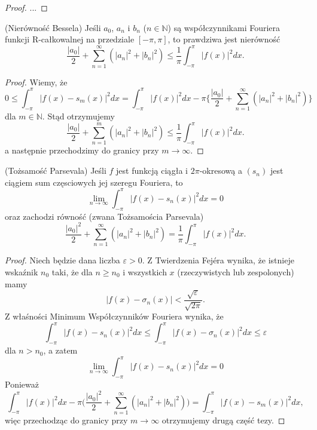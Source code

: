 \documentclass[leqno]{article}
\begin{document}
\begin{justify}
\begin{proof}
...
\end{proof}

\begin{wniosek}
{
    (Nierówność Bessela) Jeśli $a_0$, $a_n$ i $b_n$ ($n \in \mathbb{N}$) są współczynnikami Fouriera
    funkcji R-całkowalnej na przedziale $[-\pi, \pi]$, to prawdziwa jest nierówność 
    \[
        \frac{|a_0|}{2} + \sum_{n=1}^{\infty}(|a_n|^2 + |b_n|^2) \leqslant \frac{1}{\pi}\int_{-\pi}^{\pi}|f(x)|^2dx.
    \]
}
\end{wniosek}

\begin{proof}
    Wiemy, że 
    \[
        0 \leqslant \int_{-\pi}^{\pi}|f(x) - s_m(x)|^2dx = \int_{-\pi}^{\pi}|f(x)|^2 dx - \pi \Big\{ \frac{|a_0|}{2} + \sum_{n=1}^{\infty}(|a_n|^2 + |b_n|^2)\Big\}
    \]
    dla $m \in \mathbb{N}$. Stąd otrzymujemy
    \[
        \frac{|a_0|}{2} + \sum_{n=1}^{m}(|a_n|^2 + |b_n|^2) \leqslant \frac{1}{\pi}\int_{-\pi}^{\pi}|f(x)|^2dx.
    \]
    a następnie przechodzimy do granicy przy $m \to \infty$. 
\end{proof}

\begin{theorem}
{
    (Tożsamość Parsevala)
    Jeśli $f$ jest funkcją ciągła i $2\pi$-okresową a $(s_n)$ jest ciągiem sum częsciowych jej szeregu Fouriera, to 
    \[
        \lim_{n \to \infty}\int_{-\pi}^{\pi}{|f(x) - s_n(x)|}^2dx = 0
    \]
    oraz zachodzi równość (zwana Tożsamościa Parsevala)
    \[
        \frac{|a_0|^2}{2} + \sum_{n=1}^{\infty}(|a_n|^2 + |b_n|^2) = \frac{1}{\pi}\int_{-\pi}^{\pi}{|f(x)|}^2dx.
    \]
}
\end{theorem}

\begin{proof}
    Niech będzie dana liczba $\varepsilon > 0$. Z Twierdzenia Fejéra wynika, że istnieje wskaźnik $n_0$ taki, 
    że dla $n \geqslant n_0$ i wszystkich $x$ (rzeczywistych lub zespolonych) mamy 
    \[
        |f(x) - \sigma_n(x)| < \frac{\sqrt{\varepsilon}}{\sqrt{2\pi}}.  
    \]
    Z właśności Minimum Współczynników Fouriera wynika, że 
    \[
        \int_{-\pi}^{\pi}{|f(x) - s_n(x)|}^2dx \leqslant \int_{-\pi}^{\pi}{|f(x) - \sigma_n(x)|}^2dx \leqslant \varepsilon
    \]
    dla $n > n_0$, a zatem 
    \[
        \lim_{n \to \infty} \int_{-\pi}^{\pi}{|f(x) - s_n(x)|}^2dx = 0
    \]
    Ponieważ 
    \[
        \int_{-\pi}^{\pi}|f(x)|^2 dx - \pi\Big(\frac{|a_0|^2}{2} + \sum_{n=1}^{\infty}(|a_n|^2 + |b_n|^2)\Big) = \int_{-\pi}^{\pi}{|f(x) - s_m(x)|}^2dx,
    \]
    więc przechodząc do granicy przy $m \to \infty$ otrzymujemy drugą część tezy.
\end{proof}


\end{justify}
\end{document}
